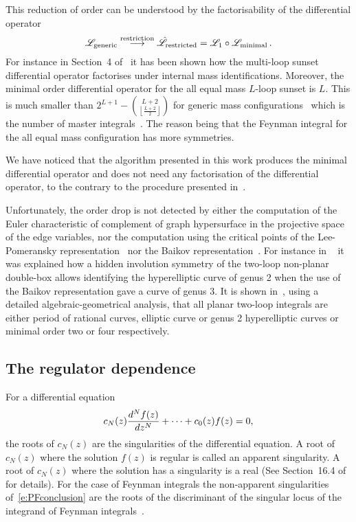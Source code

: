 \documentclass[a4paper,12pt]{article}
\numberwithin{equation}{section}
\numberwithin{figure}{section}
\begin{document}
This reduction of order can be
understood by the factorisability of the differential operator
\begin{equation}
  \mathscr{L}_{\rm generic} \stackrel{\rm restriction}{\longrightarrow}
  \hat{\mathscr{L}}_{\rm restricted}   = \mathscr{L}_1 \circ\mathscr{L}_{\rm minimal} \,.
\end{equation}
For instance in Section~4 of~\cite{Lairez:2022zkj} it has been shown
how the multi-loop sunset differential operator factorises under
internal mass identifications. Moreover,
the minimal order differential operator for the all equal
mass $L$-loop sunset is $L$. This is much smaller than 
$2^{L+1}-\binom{L+2}{\left\lfloor \frac{L+2}{2}\right\rfloor }$ for generic
mass configurations~\cite{Lairez:2022zkj} which is the number of
master integrals~\cite{Bitoun:2017nre}.
The reason being that the Feynman integral for the all equal mass
configuration has more symmetries.  

We have noticed that the algorithm presented in this work produces 
the minimal  differential operator and does not need any factorisation
of the differential operator, to the contrary to the procedure
presented in~\cite{Pogel:2022vat}. 
%
%

Unfortunately, the order drop is not detected by  either the
computation of the Euler characteristic of complement of graph
hypersurface in the projective space of the edge variables, nor the
computation using the critical points of the
Lee-Pomeransky representation~\cite{Lee:2013hzt}   nor the
Baikov
representation~\cite{Frellesvig:2017aai,Frellesvig:2019uqt,Cacciatori:2021nli}.
For instance in ~\cite{Marzucca:2023gto} it was explained how a hidden involution symmetry of the
two-loop non-planar double-box allows identifying the hyperelliptic
curve of genus 2 when the use of the Baikov representation gave a
curve of genus 3.
It is shown in~\cite{Doran:2023yzu}, using
a detailed  algebraic-geometrical analysis, that all planar two-loop
integrals are either period of rational curves, elliptic curve or genus
2 hyperelliptic curves or minimal order two or four respectively.

\subsection{The regulator dependence}
\label{sec:epsilon-dependence}

%
For a differential equation
\begin{equation}\label{e:PFconclusion}
c_N(z)  {d^Nf(z)\over dz^N}+\cdots + c_0(z) f(z)=0,
\end{equation}
the roots of $c_N(z)$ are the singularities of the differential
equation. A root of $c_N(z)$ where the solution $f(z)$ is
regular is called an apparent singularity. A root of $c_N(z)$
where the solution has a singularity is a real (See 
Section~16.4 of~\cite{Ince} for details). 
%
For the case of Feynman integrals the non-apparent singularities
of~\eqref{e:PFconclusion} are the roots of the
discriminant of the singular locus of the integrand of  Feynman
integrals~\cite{Doran:2023yzu}.
\end{document}
